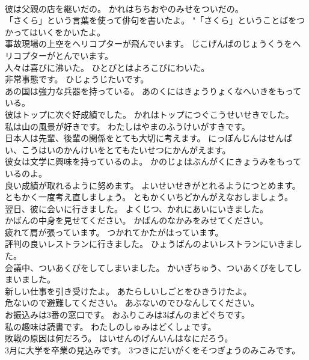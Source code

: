 \documentclass[8pt]{extreport}
\begin{document}
\begin{CJK}{UTF8}{min}
\\	彼は父親の店を継いだの。	かれはちちおやのみせをついだの。 
\\	「さくら」という言葉を使って俳句を書いたよ。	"「さくら」ということばをつかってはいくをかいたよ。 
\\	事故現場の上空をヘリコプターが飛んでいます。	じこげんばのじょうくうをヘリコプターがとんでいます。 
\\	人々は喜びに沸いた。	ひとびとはよろこびにわいた。 
\\	非常事態です。	ひじょうじたいです。 
\\	あの国は強力な兵器を持っている。	あのくにはきょうりょくなへいきをもっている。 
\\	彼はトップに次ぐ好成績でした。	かれはトップにつぐこうせいせきでした。 
\\	私は山の風景が好きです。	わたしはやまのふうけいがすきです。 
\\	日本人は先輩、後輩の関係をとても大切に考えます。	にっぽんじんはせんぱい、こうはいのかんけいをとてもたいせつにかんがえます。 
\\	彼女は文学に興味を持っているのよ。	かのじょはぶんがくにきょうみをもっているのよ。 
\\	良い成績が取れるように努めます。	よいせいせきがとれるようにつとめます。 
\\	ともかく一度考え直しましょう。	ともかくいちどかんがえなおしましょう。 
\\	翌日、彼に会いに行きました。	よくじつ、かれにあいにいきました。 
\\	かばんの中身を見せてください。	かばんのなかみをみせてください。 
\\	疲れて肩が張っています。	つかれてかたがはっています。 
\\	評判の良いレストランに行きました。	ひょうばんのよいレストランにいきました。 
\\	会議中、ついあくびをしてしまいました。	かいぎちゅう、ついあくびをしてしまいました。 
\\	新しい仕事を引き受けたよ。	あたらしいしごとをひきうけたよ。 
\\	危ないので避難してください。	あぶないのでひなんしてください。 
\\	お振込みは3番の窓口です。	おふりこみは3ばんのまどぐちです。 
\\	私の趣味は読書です。	わたしのしゅみはどくしょです。 
\\	敗戦の原因は何だろう。	はいせんのげんいんはなにだろう。 
\\	3月に大学を卒業の見込みです。	3つきにだいがくをそつぎょうのみこみです。 

\end{CJK}
\end{document}
